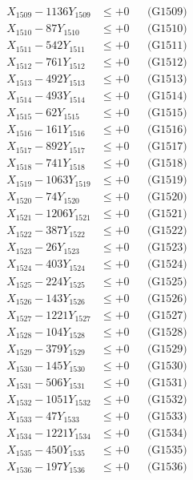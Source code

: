\documentclass[a4paper,10pt]{article}
\begin{document}
{\begin{align}
X_{1509} - 1136Y_{1509} &\leq +0 && \text{(G1509)} \\
X_{1510} - 87Y_{1510} &\leq +0 && \text{(G1510)} \\
\allowbreak
X_{1511} - 542Y_{1511} &\leq +0 && \text{(G1511)} \\
X_{1512} - 761Y_{1512} &\leq +0 && \text{(G1512)} \\
X_{1513} - 492Y_{1513} &\leq +0 && \text{(G1513)} \\
X_{1514} - 493Y_{1514} &\leq +0 && \text{(G1514)} \\
X_{1515} - 62Y_{1515} &\leq +0 && \text{(G1515)} \\
X_{1516} - 161Y_{1516} &\leq +0 && \text{(G1516)} \\
X_{1517} - 892Y_{1517} &\leq +0 && \text{(G1517)} \\
X_{1518} - 741Y_{1518} &\leq +0 && \text{(G1518)} \\
X_{1519} - 1063Y_{1519} &\leq +0 && \text{(G1519)} \\
X_{1520} - 74Y_{1520} &\leq +0 && \text{(G1520)} \\
\allowbreak
X_{1521} - 1206Y_{1521} &\leq +0 && \text{(G1521)} \\
X_{1522} - 387Y_{1522} &\leq +0 && \text{(G1522)} \\
X_{1523} - 26Y_{1523} &\leq +0 && \text{(G1523)} \\
X_{1524} - 403Y_{1524} &\leq +0 && \text{(G1524)} \\
X_{1525} - 224Y_{1525} &\leq +0 && \text{(G1525)} \\
X_{1526} - 143Y_{1526} &\leq +0 && \text{(G1526)} \\
X_{1527} - 1221Y_{1527} &\leq +0 && \text{(G1527)} \\
X_{1528} - 104Y_{1528} &\leq +0 && \text{(G1528)} \\
X_{1529} - 379Y_{1529} &\leq +0 && \text{(G1529)} \\
X_{1530} - 145Y_{1530} &\leq +0 && \text{(G1530)} \\
\allowbreak
X_{1531} - 506Y_{1531} &\leq +0 && \text{(G1531)} \\
X_{1532} - 1051Y_{1532} &\leq +0 && \text{(G1532)} \\
X_{1533} - 47Y_{1533} &\leq +0 && \text{(G1533)} \\
X_{1534} - 1221Y_{1534} &\leq +0 && \text{(G1534)} \\
X_{1535} - 450Y_{1535} &\leq +0 && \text{(G1535)} \\
X_{1536} - 197Y_{1536} &\leq +0 && \text{(G1536)} \\

\end{align}}
\end{document}
